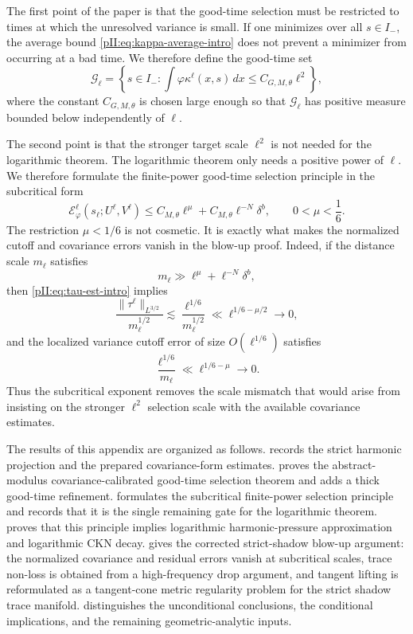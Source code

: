 \documentclass[11pt]{article}
\numberwithin{equation}{section}
\theoremstyle{plain}
\theoremstyle{definition}
\theoremstyle{remark}
\newcommand{\dx}{\,dx}
\begin{document}
The first point of the paper is that the good-time selection must be restricted to times at which the unresolved variance is small.  If one minimizes over all $s\in I_-$, the average bound \eqref{pII:eq:kappa-average-intro} does not prevent a minimizer from occurring at a bad time.  We therefore define the good-time set
\begin{equation}\label{pII:eq:good-time-set-intro}
        \mathcal G_\ell
        =\left\{s\in I_-:
        \int \varphi\kappa^\ell(x,s)\dx
        \le C_{G,M,\theta}\ell^2\right\},
\end{equation}
where the constant $C_{G,M,\theta}$ is chosen large enough so that $\mathcal G_\ell$ has positive measure bounded below independently of $\ell$.

The second point is that the stronger target scale $\ell^2$ is not needed for the logarithmic theorem.  The logarithmic theorem only needs a positive power of $\ell$.  We therefore formulate the finite-power good-time selection principle in the subcritical form
\begin{equation}\label{pII:eq:subcritical-selection-intro}
        \mathcal E_\varphi^\ell(s_\ell;U^\ell,V^\ell)
        \le C_{M,\theta}\ell^\mu+C_{M,\theta}\ell^{-N}\delta^b,
        \qquad 0<\mu<\frac16.
\end{equation}
The restriction $\mu<1/6$ is not cosmetic.  It is exactly what makes the normalized cutoff and covariance errors vanish in the blow-up proof.  Indeed, if the distance scale $m_\ell$ satisfies
\[
        m_\ell\gg \ell^\mu+\ell^{-N}\delta^b,
\]
then \eqref{pII:eq:tau-est-intro} implies
\[
        \frac{\|\tau^\ell\|_{L^{3/2}}}{m_\ell^{1/2}}
        \lesssim \frac{\ell^{1/6}}{m_\ell^{1/2}}
        \ll \ell^{1/6-\mu/2}\to0,
\]
and the localized variance cutoff error of size $O(\ell^{1/6})$ satisfies
\[
        \frac{\ell^{1/6}}{m_\ell}\ll \ell^{1/6-\mu}\to0.
\]
Thus the subcritical exponent removes the scale mismatch that would arise from insisting on the stronger $\ell^2$ selection scale with the available covariance estimates.

The results of this appendix are organized as follows.   records the strict harmonic projection and the prepared covariance-form estimates.   proves the abstract-modulus covariance-calibrated good-time selection theorem and adds a thick good-time refinement.   formulates the subcritical finite-power selection principle and records that it is the single remaining gate for the logarithmic theorem.   proves that this principle implies logarithmic harmonic-pressure approximation and logarithmic CKN decay.   gives the corrected strict-shadow blow-up argument: the normalized covariance and residual errors vanish at subcritical scales, trace non-loss is obtained from a high-frequency drop argument, and tangent lifting is reformulated as a tangent-cone metric regularity problem for the strict shadow trace manifold.   distinguishes the unconditional conclusions, the conditional implications, and the remaining geometric-analytic inputs.
\end{document}

